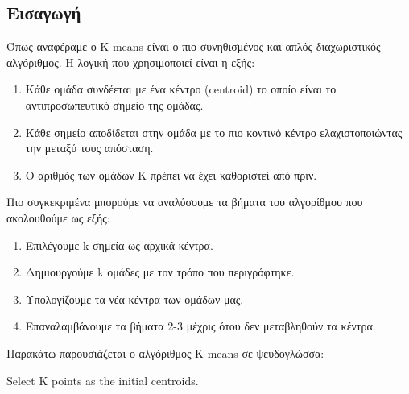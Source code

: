 \subsection{Εισαγωγή}
Όπως αναφέραμε ο K-means είναι ο πιο συνηθισμένος και απλός διαχωριστικός αλγόριθμος. Η λογική που χρησιμοποιεί είναι η εξής:
\begin{enumerate}
    \item Κάθε ομάδα συνδέεται με ένα κέντρο (centroid) το οποίο είναι το αντιπροσωπευτικό σημείο της ομάδας.
    \item Κάθε σημείο αποδίδεται στην ομάδα με το πιο κοντινό κέντρο ελαχιστοποιώντας την μεταξύ τους απόσταση.
    \item Ο αριθμός των ομάδων Κ πρέπει να έχει καθοριστεί από πριν.
\end{enumerate}

Πιο συγκεκριμένα μπορούμε να αναλύσουμε τα βήματα του αλγορίθμου που ακολουθούμε ως εξής:
\begin{enumerate}
    \item Επιλέγουμε k σημεία ως αρχικά κέντρα.
    \item Δημιουργούμε k ομάδες με τον τρόπο που περιγράφτηκε.
    \item Υπολογίζουμε τα νέα κέντρα των ομάδων μας.
    \item Επαναλαμβάνουμε τα βήματα 2-3 μέχρις ότου δεν μεταβληθούν τα κέντρα.
\end{enumerate}

Παρακάτω παρουσιάζεται ο αλγόριθμος K-means σε ψευδογλώσσα:\\
\begin{minipage}{\linewidth}
\begin{algorithm}[H]
    Select K points as the initial centroids.\;
\end{algorithm}
\end{minipage}

